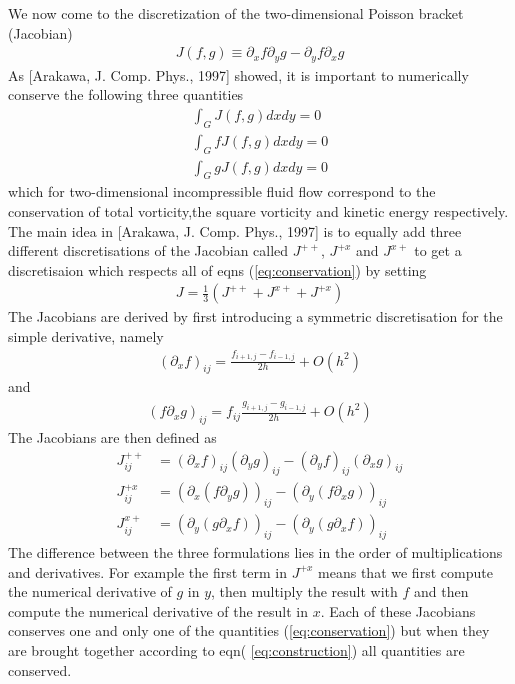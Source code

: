 \documentclass[a4paper,12pt]{scrartcl}
\begin{document}
We now come to the discretization of the two-dimensional Poisson bracket (Jacobian)
\begin{align}
    J(f,g) \equiv \partial_x f \partial_y g - \partial_y f\partial_x g
    \label{eq:jacobian}
\end{align}
As [Arakawa, J. Comp. Phys., 1997] showed, it is important to numerically conserve
the following three quantities
\begin{subequations}
\begin{align}
    \int_G J(f,g) dxdy = 0 \\
    \int_G fJ(f,g) dxdy = 0\\
    \int_G gJ(f,g) dxdy = 0
    \label{eq:conservation}
\end{align}
\end{subequations}
which for two-dimensional incompressible fluid flow correspond to the conservation of
total vorticity,the square vorticity and kinetic energy respectively.
The main idea in [Arakawa, J. Comp. Phys., 1997] is
to equally add three different discretisations of the Jacobian called $J^{++}$, 
$J^{+x}$ and $J^{x+}$ to get a discretisaion which respects all of 
eqns (\ref{eq:conservation}) by setting
\begin{align}
    J = \frac{1}{3}\left( J^{++}+J^{x+}+J^{+x} \right)   
    \label{eq:construction}
\end{align}
The Jacobians are derived by first introducing a symmetric discretisation for the
simple derivative, namely
\begin{align}
    (\partial_x f)_{ij} = \frac{f_{i+1,j}-f_{i-1,j}}{2h} + O(h^2)
    \label{eq:derivative}
\end{align}
and 
\begin{align}
    (f\partial_x g)_{ij} = f_{ij}\frac{g_{i+1,j}-g_{i-1,j}}{2h}+O(h^2)
    \label{}
\end{align}
The Jacobians are then defined as
\begin{subequations}
\begin{align}
    J_{ij}^{++} &= (\partial_x f)_{ij} (\partial_y g)_{ij} - (\partial_y f)_{ij}(\partial_x g)_{ij} \\
    J_{ij}^{+x} &= (\partial_x( f\partial_y g))_{ij} - (\partial_y( f\partial_x g))_{ij}\\
    J_{ij}^{x+} &= (\partial_y( g\partial_x f))_{ij} - (\partial_y( g\partial_x f))_{ij}
    \label{}
\end{align}
\label{}
\end{subequations}
The difference between the three formulations lies in the order of multiplications
and derivatives. For example the first term in $J^{+x}$ means that we
first compute the numerical derivative of $g$ in $y$, then multiply the result with 
$f$ and then compute the numerical derivative of the result in $x$.
Each of these Jacobians conserves one and only one of the quantities (\ref{eq:conservation}) but when they are brought together according to eqn( \ref{eq:construction})
all quantities are conserved. 
\end{document}
